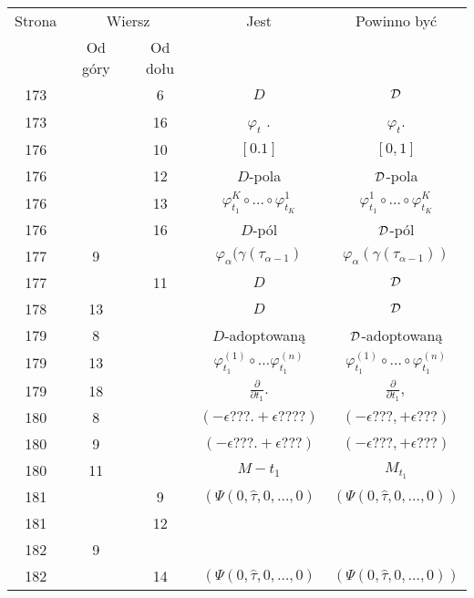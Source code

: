 \documentclass[a4paper,11pt]{article}
\begin{document}
\begin{center}
  \begin{tabular}{|c|c|c|c|c|}
    \hline
    Strona & \multicolumn{2}{c|}{Wiersz} & Jest
                              & Powinno być \\ \cline{2-3}
    & Od góry & Od dołu & & \\
    \hline
    173 & & \hphantom{0}6 & $D$ & $\mathcal{D}$ \\
    173 & & 16 & $\varphi_{ t }$ . & $\varphi_{ t }$. \\
    176 & & 10 & $[ 0. 1 ]$ & $[ 0, 1 ]$ \\
    176 & & 12 & $D$-pola & $\mathcal{D}$-pola \\
    176 & & 13 & $\varphi_{ t_{ 1 } }^{ K } \circ \ldots \circ \varphi_{ t_{ K } }^{ 1 }$
           & $\varphi_{ t_{ 1 } }^{ 1 } \circ \ldots \circ \varphi_{ t_{ K } }^{ K }$ \\
    176 & & 16 & $D$-pól & $\mathcal{D}$-pól \\
    177 & \hphantom{0}9 & & $\varphi_{ \alpha }( \gamma ( \tau_{ \alpha - 1 } )$
           & $\varphi_{ \alpha }( \gamma ( \tau_{ \alpha - 1 } ) )$ \\
    177 & & 11 & $D$ & $\mathcal{D}$ \\
    178 & 13 & & $D$ & $\mathcal{D}$ \\
    179 & \hphantom{0}8 & & $D$-adoptowaną & $\mathcal{D}$-adoptowaną \\
    179 & 13 & & $\varphi_{ t_{ 1 } }^{ ( 1 ) } \circ \ldots \varphi_{ t_{ 1 } }^{ ( n ) }$
           & $\varphi_{ t_{ 1 } }^{ ( 1 ) } \circ \ldots \circ \varphi_{ t_{ 1 } }^{ ( n ) }$
    \\
    179 & 18 & & $\frac{ \partial }{ \partial t_{ 1 } }.$
           & $\frac{ \partial }{ \partial t_{ 1 } },$ \\
    180 & \hphantom{0}8 & & $( -\epsilon???. +\epsilon???? )$ & $( -\epsilon???, +\epsilon??? )$ \\
    180 & \hphantom{0}9 & & $( -\epsilon???. +\epsilon??? )$ & $( -\epsilon???, +\epsilon??? )$ \\
    180 & 11 & & $M - t_{ 1 }$ & $M_{ t_{ 1 } }$ \\
    181 & & \hphantom{0}9 & $\left( \Psi( 0, \hat{ \tau }, 0, \ldots, 0) \right.$
           & $\left( \Psi( 0, \hat{ \tau }, 0, \ldots, 0) \right)$ \\
    181 & & 12 & & \\
    182 & \hphantom{0}9 & & & \\
    182 & & 14 & $\left( \Psi( 0, \hat{ \tau }, 0, \ldots, 0) \right.$
           & $\left( \Psi( 0, \hat{ \tau }, 0, \ldots, 0) \right)$ \\

\end{tabular}
\end{center}
\end{document}
